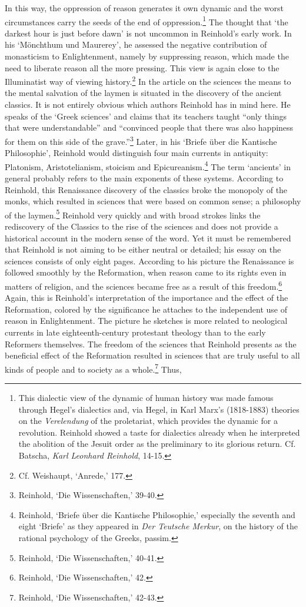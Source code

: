 In this way, the oppression of reason generates it own dynamic and the worst circumstances carry the seeds of the end of oppression.\footnote{ This dialectic view of the dynamic of human history was made famous through Hegel's dialectics and, via Hegel, in Karl Marx's (1818{-}1883) theories on the \textit{Verelendung }of the proletariat, which provides the dynamic for a revolution. Reinhold showed a taste for dialectics already when he interpreted the abolition of the Jesuit order as the preliminary to its glorious return. Cf. Batscha, \textit{Karl Leonhard Reinhold}, 14{-}15.} The thought that `the darkest hour is just before dawn' is not uncommon in Reinhold's early work. In his `M\"{o}nchthum und Maurerey', he assessed the negative contribution of monasticism to Enlightenment, namely by suppressing reason, which made the need to liberate reason all the more pressing. This view is again close to the Illuminatist way of viewing history.\footnote{ Cf. Weishaupt, `Anrede,' 177. } In the article on the sciences the means to the mental salvation of the laymen is situated in the discovery of the ancient classics. It is not entirely obvious which authors Reinhold has in mind here. He speaks of the `Greek sciences' and claims that its teachers taught ``only things that were understandable'' and ``convinced people that there was also happiness for them on this side of the grave.''\footnote{ Reinhold, `Die Wissenschaften,' 39{-}40.} Later, in his `Briefe \"{u}ber die Kantische Philosophie', Reinhold would distinguish four main currents in antiquity: Platonism, Aristotelianism, stoicism and Epicureanism.\footnote{ Reinhold, `Briefe \"{u}ber die Kantische Philosophie,' especially the seventh and eight `Briefe' as they appeared in \textit{Der Teutsche Merkur}, on the history of the rational psychology of the Greeks, passim. } The term `ancients' in general probably refers to the main exponents of these systems. According to Reinhold, this Renaissance discovery of the classics broke the monopoly of the monks, which resulted in sciences that were based on common sense; a philosophy of the laymen.\footnote{ Reinhold, `Die Wissenschaften,' 40{-}41.} Reinhold very quickly and with broad strokes links the rediscovery of the Classics to the rise of the sciences and does not provide a historical account in the modern sense of the word. Yet it must be remembered that Reinhold is not aiming to be either neutral or detailed; his essay on the sciences consists of only eight pages. According to his picture the Renaissance is followed smoothly by the Reformation, when reason came to its rights even in matters of religion, and the sciences became free as a result of this freedom.\footnote{ Reinhold, `Die Wissenschaften,' 42.} Again, this is Reinhold's interpretation of the importance and the effect of the Reformation, colored by the significance he attaches to the independent use of reason in Enlightenment. The picture he sketches is more related to neological currents in late eighteenth{-}century protestant theology than to the early Reformers themselves. The freedom of the sciences that Reinhold presents as the beneficial effect of the Reformation resulted in sciences that are truly useful to all kinds of people and to society as a whole.\footnote{ Reinhold, `Die Wissenschaften,' 42{-}43.} Thus, 